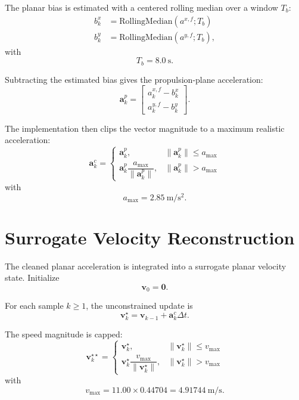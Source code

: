 \documentclass[11pt]{article}
\begin{document}
The planar bias is estimated with a centered rolling median over a window \(T_b\):
\begin{align}
b^x_k &= \mathrm{RollingMedian}(a^{x,f}; T_b) \\
b^y_k &= \mathrm{RollingMedian}(a^{y,f}; T_b),
\end{align}
with
\begin{equation}
T_b = 8.0 \ \mathrm{s}.
\end{equation}

Subtracting the estimated bias gives the propulsion-plane acceleration:
\begin{equation}
\bm{a}^p_k =
\begin{bmatrix}
a^{x,f}_k - b^x_k \\
a^{y,f}_k - b^y_k
\end{bmatrix}.
\end{equation}

The implementation then clips the vector magnitude to a maximum realistic acceleration:
\begin{equation}
\bm{a}^c_k =
\begin{cases}
\bm{a}^p_k, & \|\bm{a}^p_k\| \le a_{\max} \\
\bm{a}^p_k \dfrac{a_{\max}}{\|\bm{a}^p_k\|}, & \|\bm{a}^p_k\| > a_{\max}
\end{cases}
\end{equation}
with
\begin{equation}
a_{\max} = 2.85 \ \mathrm{m/s^2}.
\end{equation}

\section{Surrogate Velocity Reconstruction}
The cleaned planar acceleration is integrated into a surrogate planar velocity state. Initialize
\begin{equation}
\bm{v}_0 = \bm{0}.
\end{equation}

For each sample \(k \ge 1\), the unconstrained update is
\begin{equation}
\bm{v}^{\star}_k = \bm{v}_{k-1} + \bm{a}^c_k \Delta t.
\end{equation}

The speed magnitude is capped:
\begin{equation}
\bm{v}^{\star\star}_k =
\begin{cases}
\bm{v}^{\star}_k, & \|\bm{v}^{\star}_k\| \le v_{\max} \\
\bm{v}^{\star}_k \dfrac{v_{\max}}{\|\bm{v}^{\star}_k\|}, & \|\bm{v}^{\star}_k\| > v_{\max}
\end{cases}
\end{equation}
with
\begin{equation}
v_{\max} = 11.00 \times 0.44704 = 4.91744 \ \mathrm{m/s}.
\end{equation}
\end{document}
